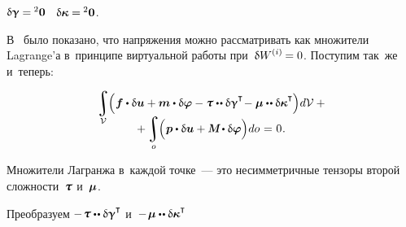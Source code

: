 \begin{otherlanguage}{russian}
\vspace{-0.56em} \noindent {}
${\updelta\hspace{-0.1ex}\bm{\upgamma} = \hspace{-0.1ex} {^2\bm{0}}}$ ~${\updelta\hspace{-0.1ex}\bm{\kappa}\hspace{-0.1ex} = \hspace{-0.1ex} {^2\bm{0}}}$.

В~ было показано, что напряжения можно рассматривать как множители Lagrange’а в~принципе виртуальной работы при~${\variation{\internalwork} = 0}$. Поступим так~же и~теперь:

\nopagebreak\vspace{-0.4em}
\begin{multline}\label{virtualworkprinciple.1:micropolarcontinuum}
\integral\displaylimits_{\mathcal{V}} \hspace{-0.64ex} \left(^{\mathstrut} \bm{f} \dotp \variation{\fieldofdisplacements}
+ \bm{m} \dotp \variation{\fieldofrotations}
- \forcestresstensor \dotdotp \variation{\distortiontensor}^{\T} \hspace{-0.4ex}
- \couplestresstensor \dotdotp \variation{\wrynesstensor}^{\T} \hspace{-0.05ex} \right) \hspace{-0.32ex} d\mathcal{V} \hspace{.5ex} + \\[-1.1em]
%
+ \integral\displaylimits_o \hspace{-0.64ex} \left(^{\mathstrut} \bm{p} \dotp \variation{\fieldofdisplacements}
+ \mathboldM \hspace{-0.1ex} \dotp \variation{\fieldofrotations} \right) \hspace{-0.32ex} do \hspace{0.12ex} = \hspace{0.1ex} 0 \hspace{0.1ex}.
\end{multline}

\vspace{-0.2em} \noindent Множители Лагранжа в~каждой точке~--- это несимметричные тензоры второй сложности~$\forcestresstensor$ и~$\bm{\mu}$.

Преобразуем ${- \hspace{.2ex} \forcestresstensor \dotdotp \variation{\distortiontensor}^{\T}}$ и~${- \hspace{.2ex} \couplestresstensor \dotdotp \variation{\wrynesstensor}^{\T}}$


\end{otherlanguage}
